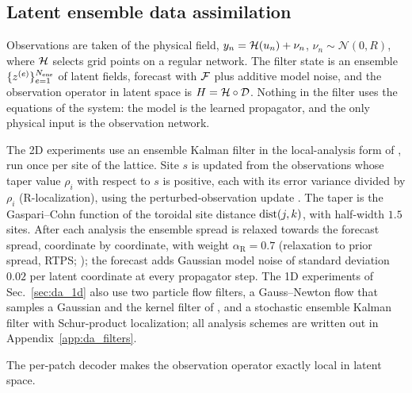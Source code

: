 \subsection{Latent ensemble data assimilation}
\label{sec:da_method}

Observations are taken of the physical field,
$y_n = \mathcal{H}(u_n) + \nu_n$, $\nu_n\sim\mathcal{N}(0,R)$, where $\mathcal{H}$
selects grid points on a regular network. The filter state is an
ensemble $\{z^{(e)}\}_{e=1}^{N_{\mathrm{ens}}}$ of latent fields, forecast with
$\mathcal{F}$ plus additive model noise, and the observation operator in latent
space is $H = \mathcal{H}\circ\mathcal{D}$. Nothing in the filter uses the equations
of the system: the model is the learned propagator, and the only
physical input is the observation network.

 The 2D experiments use an ensemble Kalman
filter in the local-analysis form of \citet{hunt2007}, run once per site of
the lattice. Site $s$ is updated from the observations whose taper value
$\rho_i$ with respect to $s$ is positive, each with its error variance
divided by $\rho_i$ (R-localization), using the perturbed-observation
update \citep{burgers1998,houtekamermitchell1998}. The taper is the
Gaspari--Cohn function \citep{gaspari1999} of the toroidal site distance
$\operatorname{dist}(j,k)$, with half-width $1.5$ sites. After each analysis the
ensemble spread is relaxed towards the forecast spread, coordinate by
coordinate, with weight $\alpha_{\mathrm R}=0.7$ (relaxation to prior spread, RTPS;
\citealp{whitakerhamill2012}); the forecast adds Gaussian model noise of
standard deviation $0.02$ per latent coordinate at every propagator step.
The 1D experiments of Sec.~\ref{sec:da_1d} also use two particle flow filters, a
Gauss--Newton flow that samples a Gaussian and the kernel filter of
\citet{huvanleeuwen2021}, and a stochastic ensemble Kalman filter with
Schur-product localization; all analysis schemes are written out in
Appendix~\ref{app:da_filters}.

The per-patch decoder makes the observation operator exactly local in
latent space.

